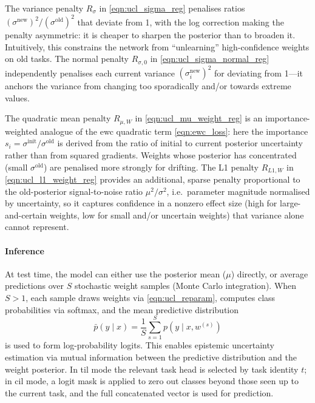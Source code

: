 The variance penalty $R_\sigma$ in \eqref{eqn:ucl_sigma_reg} penalises ratios $(\sigma^\text{new})^2 / (\sigma^\text{old})^2$ that deviate from 1, with the log correction making the penalty asymmetric: it is cheaper to sharpen the posterior than to broaden it. Intuitively, this constrains the network from ``unlearning'' high-confidence weights on old tasks. The normal penalty $R_{\sigma,0}$ in \eqref{eqn:ucl_sigma_normal_reg} independently penalises each current variance $(\sigma^\text{new}_i)^2$ for deviating from 1---it anchors the variance from changing too sporadically and/or towards extreme values.

The quadratic mean penalty $R_{\mu,W}$ in \eqref{eqn:ucl_mu_weight_reg} is an importance-weighted analogue of the \gls{ewc} quadratic term \eqref{eqn:ewc_loss}: here the importance $s_i = \sigma^\text{init}/\sigma^\text{old}$ is derived from the ratio of initial to current posterior uncertainty rather than from squared gradients. Weights whose posterior has concentrated (small $\sigma^\text{old}$) are penalised more strongly for drifting. The L1 penalty $R_{L1,W}$ in \eqref{eqn:ucl_l1_weight_reg} provides an additional, sparse penalty proportional to the old-posterior signal-to-noise ratio $\mu^2/\sigma^2$, i.e.\ parameter magnitude normalised by uncertainty, so it captures confidence in a nonzero effect size (high for large-and-certain weights, low for small and/or uncertain weights) that variance alone cannot represent.

\paragraph{Inference}

At test time, the model can either use the posterior mean ($\mu$) directly, or average predictions over $S$ stochastic weight samples (Monte Carlo integration). When $S > 1$, each sample draws weights via \eqref{eqn:ucl_reparam}, computes class probabilities via softmax, and the mean predictive distribution
%
\begin{equation}\label{eqn:ucl_mc}
    \bar{p}(y \mid x) = \frac{1}{S} \sum_{s=1}^{S} p(y \mid x, w^{(s)})
\end{equation}
%
is used to form log-probability logits. This enables epistemic uncertainty estimation via mutual information between the predictive distribution and the weight posterior. In \gls{til} mode the relevant task head is selected by task identity $t$; in \gls{cil} mode, a logit mask is applied to zero out classes beyond those seen up to the current task, and the full concatenated vector is used for prediction.
